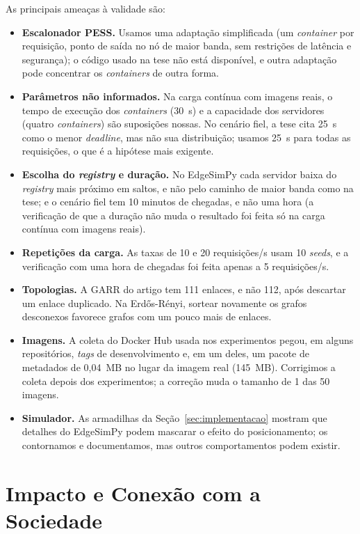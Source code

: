\documentclass[12pt]{article}
\begin{document}
As principais ameaças à validade são:
\begin{itemize}
  \item \textbf{Escalonador PESS.} Usamos uma adaptação simplificada (um
  \textit{container} por requisição, ponto de saída no nó de maior banda, sem
  restrições de latência e segurança); o código usado na tese não está disponível,
  e outra adaptação pode concentrar os \textit{containers} de outra forma.
  \item \textbf{Parâmetros não informados.} Na carga contínua com imagens reais,
  o tempo de execução dos \textit{containers} (30~s) e a capacidade dos servidores
  (quatro \textit{containers}) são suposições nossas. No cenário fiel, a tese cita
  25~s como o menor \textit{deadline}, mas não sua distribuição; usamos 25~s para
  todas as requisições, o que é a hipótese mais exigente.
  \item \textbf{Escolha do \textit{registry} e duração.} No EdgeSimPy cada
  servidor baixa do \textit{registry} mais próximo em saltos, e não pelo caminho de
  maior banda como na tese; e o cenário fiel tem 10 minutos de chegadas, e não uma
  hora (a verificação de que a duração não muda o resultado foi feita só na carga
  contínua com imagens reais).
  \item \textbf{Repetições da carga.} As taxas de 10 e 20 requisições/s usam
  10 \textit{seeds}, e a verificação com uma hora de chegadas foi feita apenas
  a 5 requisições/s.
  \item \textbf{Topologias.} A GARR do artigo tem 111 enlaces, e não 112, após
  descartar um enlace duplicado. Na Erdős-Rényi, sortear novamente os grafos
  desconexos favorece grafos com um pouco mais de enlaces.
  \item \textbf{Imagens.} A coleta do Docker Hub usada nos experimentos pegou, em
  alguns repositórios, \textit{tags} de desenvolvimento e, em um deles, um pacote
  de metadados de 0,04~MB no lugar da imagem real (145~MB). Corrigimos a coleta
  depois dos experimentos; a correção muda o tamanho de 1 das 50 imagens.
  \item \textbf{Simulador.} As armadilhas da Seção~\ref{sec:implementacao} mostram
  que detalhes do EdgeSimPy podem mascarar o efeito do posicionamento; os
  contornamos e documentamos, mas outros comportamentos podem existir.
\end{itemize}

\section{Impacto e Conexão com a Sociedade}
\label{sec:impacto}
\end{document}
